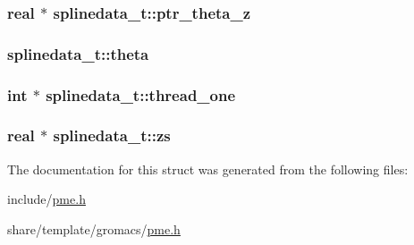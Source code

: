 \hypertarget{structsplinedata__t_a432fb23e540f7ccc0932a63be32972a8}{
\subsubsection[{ptr\-\_\-theta\-\_\-z}]{\setlength{\rightskip}{0pt plus 5cm}real $\ast$ {\bf splinedata\-\_\-t\-::ptr\-\_\-theta\-\_\-z}}}\label{structsplinedata__t_a432fb23e540f7ccc0932a63be32972a8}
\hypertarget{structsplinedata__t_a756d0aca539ab64fdb38fe6333fb7d6a}{
\subsubsection[{theta}]{ {\bf splinedata\-\_\-t\-::theta}}}\label{structsplinedata__t_a756d0aca539ab64fdb38fe6333fb7d6a}
\hypertarget{structsplinedata__t_af7586d3accc23944898f11bb1bdc8137}{
\subsubsection[{thread\-\_\-one}]{\setlength{\rightskip}{0pt plus 5cm}int $\ast$ {\bf splinedata\-\_\-t\-::thread\-\_\-one}}}\label{structsplinedata__t_af7586d3accc23944898f11bb1bdc8137}
\hypertarget{structsplinedata__t_a69bb41a5bb5128dbcb57122fd60c6a0b}{
\subsubsection[{zs}]{\setlength{\rightskip}{0pt plus 5cm}real $\ast$ {\bf splinedata\-\_\-t\-::zs}}}\label{structsplinedata__t_a69bb41a5bb5128dbcb57122fd60c6a0b}


\-The documentation for this struct was generated from the following files\-:\begin{DoxyCompactItemize}
\item 
include/\hyperlink{include_2pme_8h}{pme.\-h}\item 
share/template/gromacs/\hyperlink{share_2template_2gromacs_2pme_8h}{pme.\-h}\end{DoxyCompactItemize}
